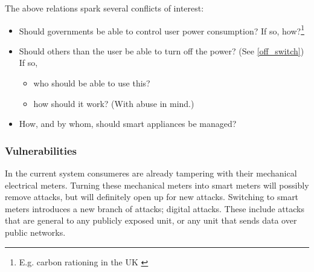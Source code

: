 The above relations spark several conflicts of interest:
\begin{itemize}
	\item Should governments be able to control user power consumption? If so, how?\footnote{E.g. carbon rationing in the UK \cite{security_economics}}
	\item Should others than the user be able to turn off the power? (See \cref{off_switch}) If so,
	\begin{itemize}
		\item who should be able to use this?
		\item how should it work? (With abuse in mind.)
	\end{itemize}
	\item How, and by whom, should smart appliances be managed?
\end{itemize}

\subsubsection{Vulnerabilities}
In the current system consumeres are already tampering  with their mechanical electrical meters.
Turning these mechanical meters into smart meters will possibly remove attacks, but will definitely open up for new attacks.
Switching to smart meters introduces a new branch of attacks; digital attacks.
These include attacks that are general to any publicly exposed unit, or any unit that sends data over public networks.
